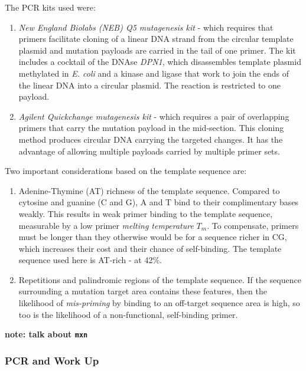 \documentclass[16pt]{book}
\begin{document}
The PCR kits used were:

\begin{enumerate}
	\item \textit{New England Biolabs (NEB) Q5 mutagenesis kit} - which requires that primers facilitate cloning of a linear DNA strand from the circular template plasmid and mutation payloads are carried in the tail of one primer.
	The kit includes a cocktail of the DNAse \textit{DPN1}, which disassembles template plasmid methylated in \textit{E. coli} and a kinase and ligase that work to join the ends of the linear DNA into a circular plasmid.
	The reaction is restricted to one payload.

	\item \textit{Agilent Quickchange mutagenesis kit} - which requires a pair of overlapping primers that carry the mutation payload in the mid-section.
	This cloning method produces circular DNA carrying the targeted changes. 
	It has the advantage of allowing multiple payloads carried by multiple primer sets.
\end{enumerate}

Two important considerations based on the template sequence are:

\begin{enumerate}
	\item Adenine-Thymine (AT) richness of the template sequence. Compared to cytosine and guanine (C and G), A and T bind to their complimentary bases weakly.
		This results in weak primer binding to the template sequence, measurable by a low primer \textit{melting temperature} $T_m$.
	To compensate, primers must be longer than they otherwise would be for a sequence richer in CG, which increases their cost and their chance of self-binding.
	The template sequence used here is AT-rich - at 42\%.
	\item Repetitions and palindromic regions of the template sequence. 
		If the sequence surrounding a mutation target area contains these features, then the likelihood of \textit{mis-priming} by binding to an off-target sequence area is high, so too is the likelihood of a non-functional, self-binding primer.
\end{enumerate}

\textbf{note: talk about \texttt{mxn}}

\subsubsection{PCR and Work Up}
\end{document}
